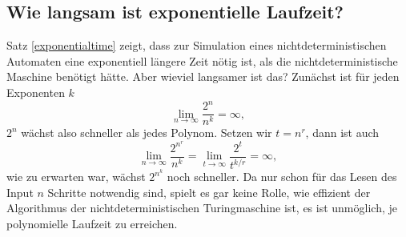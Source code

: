 \subsection{Wie langsam ist exponentielle Laufzeit?}
Satz \ref{exponentialtime} zeigt, dass zur Simulation eines
nichtdeterministischen Automaten eine exponentiell längere
Zeit nötig ist, als die nichtdeterministische Maschine
benötigt hätte. Aber wieviel langsamer ist das?
Zunächst ist für jeden Exponenten $k$
\[
\lim_{n\to\infty}\frac{2^{n}}{n^k}=\infty,
\]
$2^n$ wächst also schneller als jedes Polynom. 
Setzen wir $t=n^r$, dann ist auch
\[
\lim_{n\to\infty}\frac{2^{n^r}}{n^k}
=
\lim_{t\to\infty}\frac{2^t}{t^{k/r}}
=
\infty,
\]
wie zu erwarten war, wächst $2^{n^k}$ noch schneller.
Da nur schon für das Lesen des Input $n$ Schritte notwendig sind,
spielt es gar keine Rolle, wie effizient der Algorithmus der
nichtdeterministischen Turingmaschine ist, es ist unmöglich,
je polynomielle Laufzeit zu erreichen.

